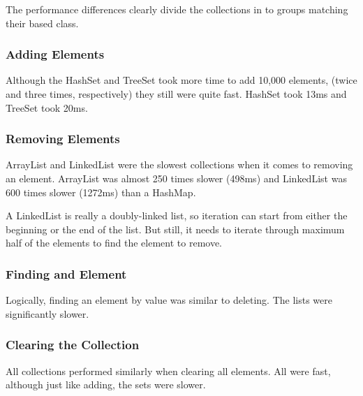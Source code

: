 The performance differences clearly divide the collections in to groups matching their based class.

\subsubsection{Adding Elements}
Although the HashSet and TreeSet took more time to add 10,000 elements, (twice and three times, respectively) they still were quite fast. HashSet took 13ms and TreeSet took 20ms.

\subsubsection{Removing Elements}
ArrayList and LinkedList were the slowest collections when it comes to removing an element. ArrayList was almost 250 times slower (498ms) and LinkedList was 600 times slower (1272ms) than a HashMap.

A LinkedList is really a doubly-linked list, so iteration can start from either the beginning or the end of the list. But still, it needs to iterate through maximum half of the elements to find the element to remove.

\subsubsection{Finding and Element}
Logically, finding an element by value was similar to deleting. The lists were significantly slower.

\subsubsection{Clearing the Collection}
All collections performed similarly when clearing all elements. All were fast, although just like adding, the sets were slower.


